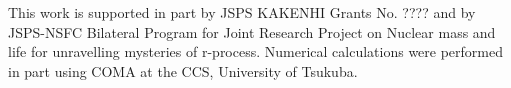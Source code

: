 \documentclass[%
superscriptaddress,
showpacs,
nofootinbib,
amsmath,amssymb,
aps,
prc,
twocolumn,
floatfix ]%
{revtex4-1}
\begin{document}


\begin{acknowledgments}
This work is supported in part by JSPS KAKENHI Grants No. ????
and
by JSPS-NSFC Bilateral Program for Joint Research Project
on Nuclear mass and life for unravelling mysteries of r-process.
Numerical calculations were performed in part using COMA at the CCS,
University of Tsukuba.
\end{acknowledgments}



\end{document}
